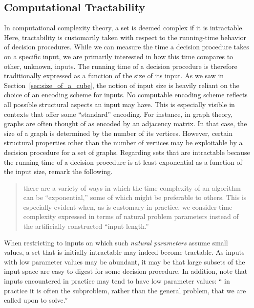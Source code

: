 \subsection{Computational Tractability}
\label{sec:history:tractability}%
In computational complexity theory, a set is deemed complex if it is intractable.
Here, tractability is customarily taken with respect to the running-time behavior of decision procedures.
While we can measure the time a decision procedure takes on a specific input, we are primarily interested in how this time compares to other, unknown, inputs.
The running time of a decision procedure is therefore traditionally expressed as a function of the size of its input.
As we saw in Section~\ref{sec:size_of_a_cube}, the notion of input size is heavily reliant on the choice of an encoding scheme for inputs.
No computable encoding scheme reflects all possible structural aspects an input may have.
This is especially visible in contexts that offer some \enquote{standard} encoding.
For instance, in graph theory, graphs are often thought of as encoded by an adjacency matrix.
In that case, the size of a graph is determined by the number of its vertices.
However, certain structural properties other than the number of vertices may be exploitable by a decision procedure for a set of graphs.
Regarding sets that are intractable because the running time of a decision procedure is at least exponential as a function of the input size, \citeauthor{garey1979computers} remark the following.
\blockcquote[Section~4.3]{garey1979computers}{
  \textelp{} there are a variety of ways in which the time complexity of an algorithm can be \enquote{exponential,} some of which might be preferable to others.
  This is especially evident when, as is customary in practice, we consider time complexity expressed in terms of natural problem parameters instead of the artificially constructed \enquote{input length.}
}
When restricting to inputs on which such \emph{natural parameters} assume small values, a set that is initially intractable may indeed become tractable.
As inputs with low parameter values may be abundant, it may be that large subsets of the input space are easy to digest for some decision procedure.
In addition, \citeauthor{garey1979computers} note that inputs encountered in practice may tend to have low parameter values:
\enquote{\textelp{} in practice it is often the subproblem, rather than the general problem, that we are called upon to solve.}


